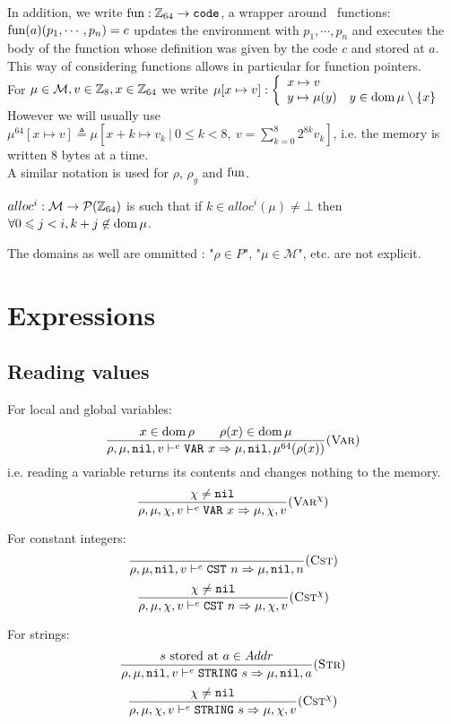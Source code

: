 In addition, we write \(\text{fun}: \mathbb{Z}_{64}\to \texttt{code}\), a wrapper around \Cmp\ functions: \(\text{fun}(a)(p_1, \cdots, p_n) = c\) updates the environment with \(p_1, \cdots, p_n\) and executes the body of the function whose definition was given by the code \(c\) and stored at \(a\). This way of considering functions allows in particular for function pointers.\\

For \(\mu\in\mathcal{M}, v\in\mathbb{Z}_{8}, x\in\mathbb{Z}_{64}\) we write \(\mu[x\mapsto v]: \left\{\begin{array}{ll}x\mapsto v & \\ y\mapsto \mu(y) & y\in \operatorname{dom}\mu\setminus\{x\}\end{array}\right.\)\\
However we will usually use \(\mu^{64}[x\mapsto v] \triangleq\mu[x+k\mapsto v_k\ |\  0\leq k<8,\ v = \sum_{k=0}^8 2^{8k}v_k]\), i.e. the memory is written 8 bytes at a time.\\

A similar notation is used for \(\rho\), \(\rho_g\) and \(\text{fun}\).

\(alloc^i: \mathcal{M}\to \mathcal{P}(\mathbb{Z}_{64})\) is such that if \(k \in alloc^i(\mu) \ne \bot\) then \(\forall 0\leqslant j < i, k+j\not\in\operatorname{dom}\mu\).

The domains as well are ommitted : "\(\rho\in P\)", "\(\mu\in\mathcal{M}\)", etc. are not explicit.

\section{Expressions}
\subsection{Reading values}
For local and global variables:
\[\dfrac{x\in\operatorname{dom}\rho \qquad \rho(x)\in\operatorname{dom}\mu}{\rho,\mu,\texttt{nil},v \vdash^e \texttt{VAR}\ x\Rightarrow \mu,\texttt{nil},\mu^{64}(\rho(x))}(\textsc{Var})\]
i.e. reading a variable returns its contents and changes nothing to the memory.\\
\[\dfrac{\chi\ne\texttt{nil}}{\rho,\mu,\chi,v \vdash^e \texttt{VAR}\ x\Rightarrow \mu,\chi,v} (\textsc{Var}^\chi)\]

For constant integers:
\[\dfrac{}{\rho,\mu,\texttt{nil},v \vdash^e \texttt{CST}\ n\Rightarrow \mu,\texttt{nil},n}(\textsc{Cst})\]
\[\dfrac{\chi\ne\texttt{nil}}{\rho,\mu,\chi,v \vdash^e \texttt{CST}\ n\Rightarrow \mu,\chi,v} (\textsc{Cst}^\chi)\]

For strings:
\[\dfrac{s\text{ stored at }a\in Addr}{\rho,\mu,\texttt{nil},v \vdash^e \texttt{STRING}\ s\Rightarrow \mu,\texttt{nil},a}(\textsc{Str})\]
\[\dfrac{\chi\ne\texttt{nil}}{\rho,\mu,\chi,v \vdash^e \texttt{STRING}\ s\Rightarrow \mu,\chi,v} (\textsc{Cst}^\chi)\]

